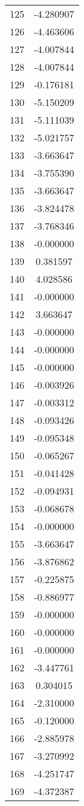 \documentclass[12pt]{article}
\begin{document}
\begin{longtable}{@{}cc@{}}
125 & -4.280907 \\
126 & -4.463606 \\
127 & -4.007844 \\
128 & -4.007844 \\
129 & -0.176181 \\
130 & -5.150209 \\
131 & -5.111039 \\
132 & -5.021757 \\
133 & -3.663647 \\
134 & -3.755390 \\
135 & -3.663647 \\
136 & -3.824478 \\
137 & -3.768346 \\
138 & -0.000000 \\
139 & 0.381597 \\
140 & 4.028586 \\
141 & -0.000000 \\
142 & 3.663647 \\
143 & -0.000000 \\
144 & -0.000000 \\
145 & -0.000000 \\
146 & -0.003926 \\
147 & -0.003312 \\
148 & -0.093426 \\
149 & -0.095348 \\
150 & -0.065267 \\
151 & -0.041428 \\
152 & -0.094931 \\
153 & -0.068678 \\
154 & -0.000000 \\
155 & -3.663647 \\
156 & -3.876862 \\
157 & -0.225875 \\
158 & -0.886977 \\
159 & -0.000000 \\
160 & -0.000000 \\
161 & -0.000000 \\
162 & -3.447761 \\
163 & 0.304015 \\
164 & -2.310000 \\
165 & -0.120000 \\
166 & -2.885978 \\
167 & -3.270992 \\
168 & -4.251747 \\
169 & -4.372387 \\

\end{longtable}
\end{document}
